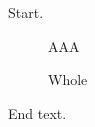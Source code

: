 \documentclass{article}
\begin{document}
Start.
\begin{figure}
\begin{minipage}{.4\textwidth}AAA\end{minipage}
\caption{Whole}
\end{figure}
End text.
\end{document}
